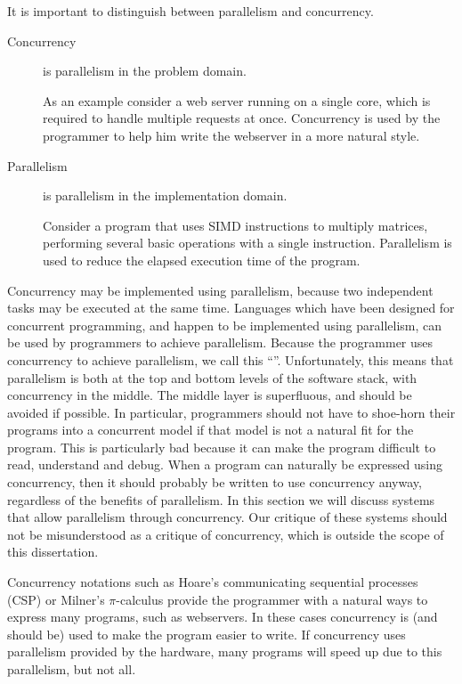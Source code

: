 It is important to distinguish between parallelism and concurrency.
\begin{description}
    \item[Concurrency] is parallelism in the problem domain.

    As an example consider a web server running on a single core,
    which is required to handle multiple requests at once.
    Concurrency is used by the programmer to help him write the webserver in
    a more natural style.

    \item[Parallelism] is parallelism in the implementation domain.
   
    Consider a program that uses SIMD instructions to multiply matrices,
    performing several basic operations with a single instruction.
    Parallelism is used to reduce the elapsed execution time of the program. 

\end{description}

Concurrency may be implemented using parallelism,
because two independent tasks may be executed at the same time.
Languages which have been designed for concurrent programming,
and happen to be implemented using parallelism,
can be used by programmers to achieve parallelism.
Because the programmer uses concurrency to achieve parallelism,
we call this ``\pvc''.
Unfortunately,
this means that parallelism is both at the top and bottom levels of the
software stack, with concurrency in the middle.
The middle layer is superfluous, and should be avoided if possible.
In particular,
programmers should not have to shoe-horn their programs into a concurrent
model if that model is not a natural fit for the program.
This is particularly bad because it can make the program difficult to read,
understand and debug.
When a program can naturally be expressed using concurrency,
then it should probably be written to use concurrency anyway,
regardless of the benefits of parallelism.
In this section we will discuss systems that allow parallelism through
concurrency.
Our critique of these systems should not be misunderstood as a critique of
concurrency,
which is outside the scope of this dissertation.

Concurrency notations such as Hoare's
communicating sequential processes (CSP) \citep{hoare:1975:csp}
or Milner's $\pi$-calculus \citep{milner:pi}
provide the programmer with a natural ways to express many programs,
such as webservers.
In these cases concurrency is (and should be) used to make the program
easier to write.
If concurrency uses parallelism provided by the hardware,
many programs will speed up due to this parallelism, but not all.

